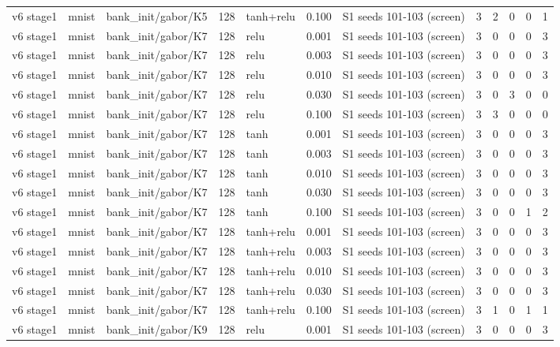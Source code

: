 \begin{table}[htbp]
{\begin{tabular}{@{}lllrlrlrrrrr@{}}
v6 stage1 & mnist & bank\_init/gabor/K5 & 128 & tanh+relu & 0.100 & S1 seeds 101-103 (screen) & 3 & 2 & 0 & 0 & 1 \\
v6 stage1 & mnist & bank\_init/gabor/K7 & 128 & relu & 0.001 & S1 seeds 101-103 (screen) & 3 & 0 & 0 & 0 & 3 \\
v6 stage1 & mnist & bank\_init/gabor/K7 & 128 & relu & 0.003 & S1 seeds 101-103 (screen) & 3 & 0 & 0 & 0 & 3 \\
v6 stage1 & mnist & bank\_init/gabor/K7 & 128 & relu & 0.010 & S1 seeds 101-103 (screen) & 3 & 0 & 0 & 0 & 3 \\
v6 stage1 & mnist & bank\_init/gabor/K7 & 128 & relu & 0.030 & S1 seeds 101-103 (screen) & 3 & 0 & 3 & 0 & 0 \\
v6 stage1 & mnist & bank\_init/gabor/K7 & 128 & relu & 0.100 & S1 seeds 101-103 (screen) & 3 & 3 & 0 & 0 & 0 \\
v6 stage1 & mnist & bank\_init/gabor/K7 & 128 & tanh & 0.001 & S1 seeds 101-103 (screen) & 3 & 0 & 0 & 0 & 3 \\
v6 stage1 & mnist & bank\_init/gabor/K7 & 128 & tanh & 0.003 & S1 seeds 101-103 (screen) & 3 & 0 & 0 & 0 & 3 \\
v6 stage1 & mnist & bank\_init/gabor/K7 & 128 & tanh & 0.010 & S1 seeds 101-103 (screen) & 3 & 0 & 0 & 0 & 3 \\
v6 stage1 & mnist & bank\_init/gabor/K7 & 128 & tanh & 0.030 & S1 seeds 101-103 (screen) & 3 & 0 & 0 & 0 & 3 \\
v6 stage1 & mnist & bank\_init/gabor/K7 & 128 & tanh & 0.100 & S1 seeds 101-103 (screen) & 3 & 0 & 0 & 1 & 2 \\
v6 stage1 & mnist & bank\_init/gabor/K7 & 128 & tanh+relu & 0.001 & S1 seeds 101-103 (screen) & 3 & 0 & 0 & 0 & 3 \\
v6 stage1 & mnist & bank\_init/gabor/K7 & 128 & tanh+relu & 0.003 & S1 seeds 101-103 (screen) & 3 & 0 & 0 & 0 & 3 \\
v6 stage1 & mnist & bank\_init/gabor/K7 & 128 & tanh+relu & 0.010 & S1 seeds 101-103 (screen) & 3 & 0 & 0 & 0 & 3 \\
v6 stage1 & mnist & bank\_init/gabor/K7 & 128 & tanh+relu & 0.030 & S1 seeds 101-103 (screen) & 3 & 0 & 0 & 0 & 3 \\
v6 stage1 & mnist & bank\_init/gabor/K7 & 128 & tanh+relu & 0.100 & S1 seeds 101-103 (screen) & 3 & 1 & 0 & 1 & 1 \\
v6 stage1 & mnist & bank\_init/gabor/K9 & 128 & relu & 0.001 & S1 seeds 101-103 (screen) & 3 & 0 & 0 & 0 & 3 \\

\end{tabular}}
\end{table}
